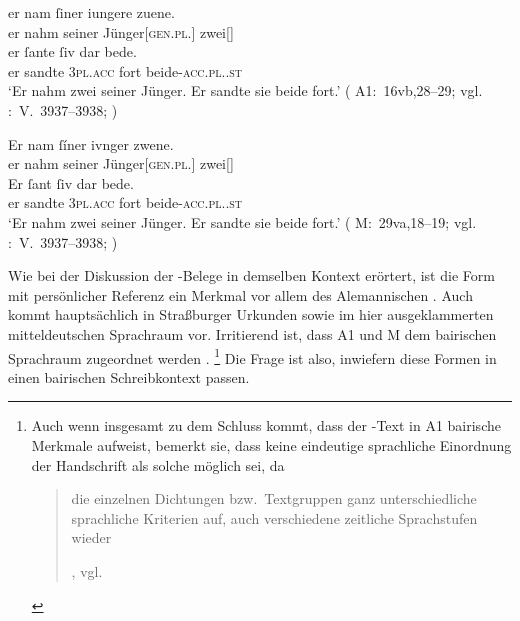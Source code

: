\begin{exe}
\ex \label{ex:siubedea1m}
	\begin{xlist}
	\ex \label{ex:siubedea1m_1}
		\gll er nam ſiner iungere zuene. \\
				er nahm seiner Jünger[\textsc{gen.pl.\MascM}] zwei[\MascM] \\
	\sn \gll er ſante ſiv dar bede. \\
			er sandte \textsc{3pl\subM.acc} fort
				beide-\textsc{acc.pl.\MascM.st} \\
		\trans `Er nahm zwei seiner Jünger. Er sandte sie beide fort.'
			(%
				A1:~16vb,28--29; vgl.
				\KC:~V.~3937--3938;
				\cite[153]{schroeder1895}%
			)
	
	\ex \label{ex:siubedea1m_2}
		\gll Er nam ſíner ivnger zwene. \\
				er nahm seiner Jünger[\textsc{gen.pl.\MascM}] zwei[\MascM] \\
	\sn \gll Er ſant ſiv dar bede. \\
			er sandte \textsc{3pl\subM.acc} fort
				beide-\textsc{acc.pl.\MascM.st} \\
		\trans `Er nahm zwei seiner Jünger. Er sandte sie beide fort.'
			(%
				M:~29va,18--19; vgl.
				\KC:~V.~3937--3938;
				\cite[153]{schroeder1895}%
			)
\end{xlist}
\end{exe}

Wie bei der Diskussion der \CAO{}-Belege in demselben Kontext erörtert, ist die
Form  mit persönlicher Referenz ein Merkmal vor allem des
Alemannischen \autocite[vgl.][395]{ksw2}. Auch
 kommt hauptsächlich in Straßburger Urkunden sowie im hier
ausgeklammerten mitteldeutschen
Sprachraum vor. Irritierend ist, dass A1 und M dem
bairischen Sprachraum zugeordnet werden
\autocites{wolf:kckat}[266--276]{fleischer2019}.%
%
	\footnote{Auch wenn \citet[40--41]{schneider1987} insgesamt zu dem Schluss
		kommt, dass der \KC{}-Text in A1 bairische Merkmale
		aufweist, bemerkt sie, dass keine eindeutige sprachliche
		Einordnung der Handschrift als solche möglich sei, da
		\blockquote[{\cite[40]{schneider1987},
		vgl.~\nosh\cites[519]{gaertner1999}[1638]{2vl11}}]{die einzelnen
		Dichtungen bzw.\ Textgruppen ganz unterschiedliche
		sprachliche Kriterien
		auf, \textelp{} auch verschiedene
		zeitliche Sprachstufen
		wieder }.%
	}
%
Die Frage ist also, inwiefern diese Formen in einen
bairischen Schreib\-kontext passen.

